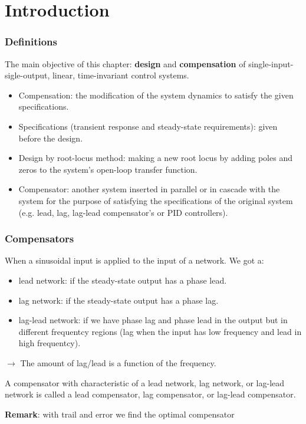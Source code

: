 \section{Introduction}

\begin{frame}
	\frametitle{Definitions}
		The main objective of this chapter: \textbf{design} and \textbf{compensation} of single-input-sigle-output, linear, time-invariant control systems.
		\begin{itemize}
			\item Compensation: the modification of the system dynamics to satisfy the given specifications.
			\item Specifications (transient response and steady-state requirements): given before the design.
			\item Design by root-locus method: making a new root locus by adding poles and zeros to the system's open-loop transfer function.
			\item Compensator: another system inserted in parallel or in cascade with the system for the purpose of satisfying the specifications of the original system (e.g. lead, lag, lag-lead compensator's or PID controllers).
		\end{itemize}
\end{frame}

\begin{frame}
	\frametitle{Compensators}
	When a sinusoidal input is applied to the input of a network. We got a:
	\begin{itemize}
		\item lead network: if the steady-state output has a phase lead.
		\item lag network: if the steady-state output has a phase lag.
		\item lag-lead network: if we have phase lag and phase lead in the output but in different frequentcy regions (lag when the input has low frequency and lead in high frequentcy). 
	\end{itemize}
	$\rightarrow$ The amount of lag/lead is a function of the frequency. \vspace{4mm}
	
	A compensator with characteristic of a lead network, lag network, or lag-lead network is called a lead compensator, lag compensator, or lag-lead compensator. 
	
	\textbf{Remark}: with trail and error we find the optimal compensator
\end{frame}


